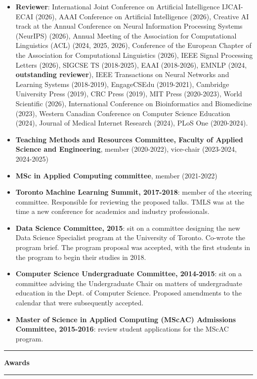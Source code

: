 \documentclass[letterpaper,11pt]{article}
\newcommand{\resheading}[1]{%
  \vspace{10pt}%
  \noindent\textcolor{accent}{\rule{3pt}{12pt}}\hspace{6pt}%
  {\large \textbf{\textcolor{accent}{#1}}}%
  \vspace{2pt}%
  \par\noindent\textcolor{accent!30}{\rule{\textwidth}{0.5pt}}%
  \vspace{2pt}%
}
\begin{document}
\begin{itemize}
\item
\textbf{Reviewer}:  International Joint Conference on Artificial Intelligence  IJCAI-ECAI (2026), AAAI Conference on Artificial Intelligence (2026), Creative AI track at the Annual Conference on Neural Information Processing Systems (NeurIPS) (2026), Annual Meeting of the Association for Computational Linguistics (ACL) (2024, 2025, 2026), Conference of the European Chapter of the Association for Computational Linguistics (2026), IEEE Signal Processing Letters (2026), SIGCSE TS (2018-2025), EAAI (2018-2026), EMNLP (2024, \textbf{outstanding reviewer}), IEEE Transactions on Neural Networks and Learning Systems (2018-2019), EngageCSEdu (2019-2021), Cambridge University Press (2019), CRC Press (2019), MIT Press (2020-2023), World Scientific (2026), International Conference on Bioinformatics and Biomedicine (2023), Western Canadian Conference on Computer Science Education (2024), Journal of Medical Internet Research (2024), PLoS One (2020-2024).
\item
	\textbf{Teaching Methods and Resources Committee, Faculty of Applied Science and Engineering}, member (2020-2022), vice-chair (2023-2024, 2024-2025)
\item	
	\textbf{MSc in Applied Computing committee}, member (2021-2022)
\item
	\textbf{Toronto Machine Learning Summit, 2017-2018}: member of the steering committee. Responsible for reviewing the proposed talks. TMLS was at the time a new conference for academics and industry professionals.
\item
	\textbf{Data Science Committee, 2015}: sit on a committee designing the new Data Science Specialist program at the University of Toronto. Co-wrote the program brief. The program proposal was accepted, with the first students in the program to begin their studies in 2018.
\item
	\textbf{Computer Science Undergraduate Committee, 2014-2015}: sit on a committee advising the Undergraduate Chair on matters of undergraduate education in the Dept. of Computer Science. Proposed amendments to the calendar that were subsequently accepted.
\item	
	\textbf{Master of Science in Applied Computing (MScAC) Admissions Committee, 2015-2016}: review student applications for the MScAC  program.


\end{itemize}

\resheading{Awards}
\end{document}
